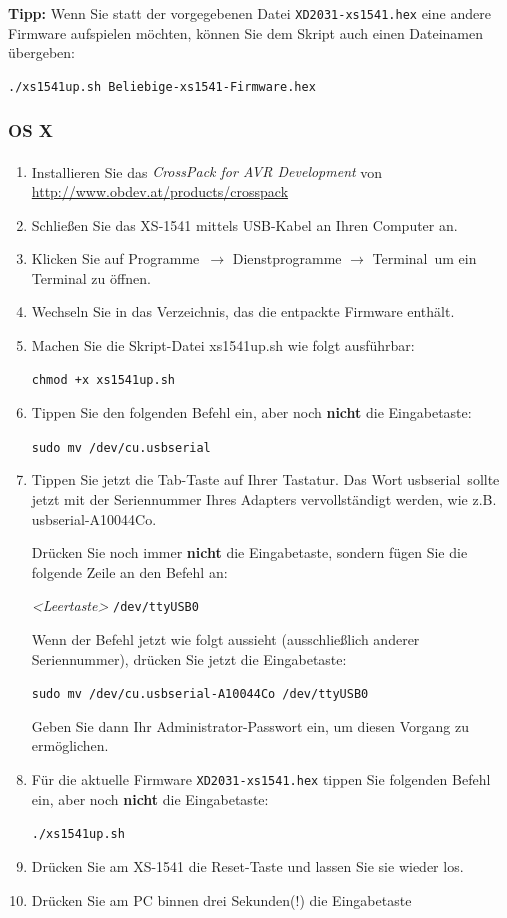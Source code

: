 \documentclass[10pt,a4paper]{scrartcl}		%
\begin{document}
\textbf{Tipp:} Wenn Sie statt der vorgegebenen Datei 
\texttt{XD2031-xs1541.hex}
eine andere Firmware aufspielen möchten, können Sie
dem Skript auch einen Dateinamen übergeben:

\begin{verbatim}
./xs1541up.sh Beliebige-xs1541-Firmware.hex
\end{verbatim}

\subsubsection*{OS X}
\begin{enumerate}
\item Installieren Sie das \textit{CrossPack for 
AVR\textsuperscript{\textregistered} Development} von 
\\\url{http://www.obdev.at/products/crosspack}
\item Schließen Sie das XS-1541 mittels USB-Kabel an Ihren Computer an.
\item Klicken Sie auf \glqq Programme\grqq\ $\to$ \glqq Dienstprogramme\grqq
$\to$ \glqq Terminal\grqq\ um ein Terminal zu öffnen.
\item Wechseln Sie in das Verzeichnis, das die entpackte Firmware enthält.
\item Machen Sie die Skript-Datei xs1541up.sh wie folgt ausführbar:

\texttt{chmod +x xs1541up.sh}
\item Tippen Sie den folgenden Befehl ein, aber noch \textbf{nicht} die
Eingabetaste:

\texttt{sudo mv /dev/cu.usbserial}

\item Tippen Sie jetzt die Tab-Taste auf Ihrer Tastatur. Das Wort
\glqq usbserial\grqq\ sollte jetzt mit der Seriennummer Ihres Adapters
vervollständigt werden, wie z.B. usbserial-A10044Co.

Drücken Sie noch immer \textbf{nicht} die Eingabetaste, sondern fügen
Sie die folgende Zeile an den Befehl an:

\textit{<Leertaste>} \texttt{/dev/ttyUSB0}

Wenn der Befehl jetzt wie folgt aussieht (ausschließlich anderer
Seriennummer), drücken Sie jetzt die Eingabetaste:

\texttt{sudo mv /dev/cu.usbserial-A10044Co /dev/ttyUSB0}

Geben Sie dann Ihr Administrator-Passwort ein, um diesen Vorgang
zu ermöglichen.
\item Für die aktuelle Firmware 
   \texttt{XD2031-xs1541.hex} tippen Sie
	folgenden Befehl ein, aber noch \textbf{nicht} die
	Eingabetaste:

	\texttt{./xs1541up.sh}

\item Drücken Sie am XS-1541 die Reset-Taste und lassen Sie sie wieder los.
\item Drücken Sie am PC binnen drei Sekunden(!) die Eingabetaste
\end{enumerate}
\end{document}
